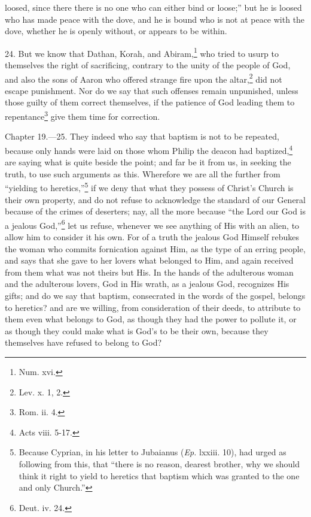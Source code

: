 loosed, since there there is no one who can either bind or loose;'' but he is loosed who has made peace with the dove, and he is bound who is not at peace with the dove, whether he is openly without, or appears to be within.

24. But we know that Dathan, Korah, and Abiram,\footnote{\par  Num. xvi.} who tried to usurp to themselves the right of sacrificing, contrary to the unity of the people of God, and also the sons of Aaron who offered strange fire upon the altar,\footnote{\par  Lev. x. 1, 2.} did not escape punishment. Nor do we say that such offenses remain unpunished, unless those guilty of them correct themselves, if the patience of God leading them to repentance\footnote{\par  Rom. ii. 4.} give them time for correction.


Chapter 19.—25. They indeed who say that baptism is not to be repeated, because only hands were laid on those whom Philip the deacon had baptized,\footnote{\par  Acts viii. 5-17.} are saying what is quite beside the point; and far be it from us, in seeking the truth, to use such arguments as this. Wherefore we are all the further from ``yielding to heretics,''\footnote{\par  Because Cyprian, in his letter to Jubaianus (\emph{Ep.} lxxiii. 10), had urged as following from this, that ``there is no reason, dearest brother, why we should think it right to yield to heretics that baptism which was granted to the one and only Church.''} if we deny that what they possess of Christ’s Church is their own property, and do not refuse to acknowledge the standard of our General because of the crimes of deserters; nay, all the more because ``the Lord our God is a jealous God,''\footnote{\par  Deut. iv. 24.} let us refuse, whenever we see anything of His with an alien, to allow him to consider it his own. For of a truth the jealous God Himself rebukes the woman who commits fornication against Him, as the type of an erring people, and says that she gave to her lovers what belonged to Him, and again received from them what was not theirs but His. In the hands of the adulterous woman and the adulterous lovers, God in His wrath, as a jealous God, recognizes His gifts; and do we say that baptism, consecrated in the words of the gospel, belongs to heretics? and are we willing, from consideration of their deeds, to attribute to them even what belongs to God, as though they had the power to pollute it, or as though they could make what is God’s to be their own, because they themselves have refused to belong to God?

